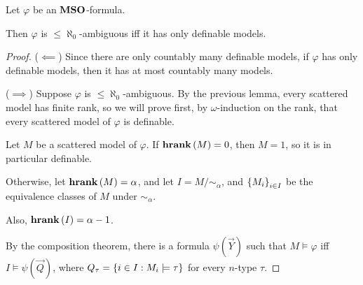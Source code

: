 \begin{lemma}
    Let $\varphi$ be an $\mathbf{MSO}$-formula.

    Then $\varphi$ is $\le \aleph_0$-ambiguous
    iff it has only definable models.
\end{lemma}

\begin{proof}
    ($\impliedby$) Since there are only countably many definable models,
    if $\varphi$ has only definable models,
    then it has at most countably many models.

    ($\implies$) Suppose $\varphi$ is $\le \aleph_0$-ambiguous.
    By the previous lemma, every scattered model has
    finite rank, so we will prove first, by $\omega$-induction
    on the rank, that every scattered model of $\varphi$ is definable.

    Let $M$ be a scattered model of $\varphi$. If $\mathbf{hrank} \left( {M} \right) = 0$,
    then $M = 1$, so it is in particular definable.

    Otherwise, let $\mathbf{hrank} \left( {M} \right) = \alpha$, and let
    $I = M / \sim_\alpha$, and $\left\{ {M_i} \right\}_{i \in I}$
    be the equivalence classes of $M$ under $\sim_\alpha$.

    Also, $\mathbf{hrank} \left( {I} \right) = \alpha - 1$.

    By the composition theorem, there is a formula
    $\psi(\vec{Y})$ such that $M \models \varphi$ iff $I \models \psi(\vec{Q})$,
    where $Q_\tau = \left\{ { i \in I : M_i \models \tau } \right\}$ for 
    every $n$-type $\tau$.

\end{proof}